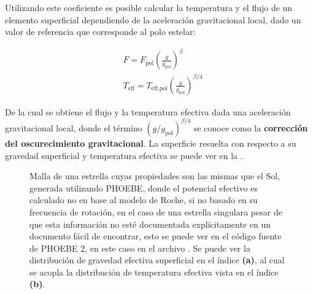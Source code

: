 Utilizando este coeficiente es posible calcular la temperatura y el flujo de un
elemento superficial dependiendo de la aceleración gravitacional local, dado un
valor de referencia que corresponde al polo estelar:

\begin{eqfloat}[!ht]
	\centering
	\begin{equation}
		\begin{split}
			& F = F_{\textrm{pol}} \left(\frac{g}{g_{\textrm{pol}}}\right)^{\beta} \\
			& T_{\textrm{eff}} = T_{\textrm{eff},\textrm{pol}} \left(\frac{g}{g_{\textrm{pol}}}\right)^{\beta/4}
		\end{split}
	\end{equation}	
\end{eqfloat}

De la cual se obtiene el flujo y la temperatura efectiva dada una aceleración
gravitacional local, donde el término
$\left(g/g_{\mathrm{pol}}\right)^{\beta/4}$ se conoce como la \textbf{corrección
del oscurecimiento gravitacional}. La superficie resuelta con respecto a su
gravedad superficial y temperatura efectiva se puede ver en la
.

\begin{figure}[!ht]
	\centering

	\caption[Distribución de gravedad superficial y temperatura efectiva
	local.]{Malla de una estrella cuyas propiedades son las mismas que el Sol,
	generada utilizando PHOEBE, donde el potencial efectivo es calculado no en
	base al modelo de Roche, si no basado en su frecuencia de rotación, en el
	caso de una estrella singular\textemdash a pesar de que esta información no
	esté documentada explícitamente en un documento fácil de encontrar, esto se
	puede ver en el código fuente de PHOEBE 2, en este caso en el archivo
	\href{https://github.com/phoebe-project/phoebe2/blob/master/phoebe/distortions/rotstar.py}{}.
	Se puede ver la distribución de gravedad efectiva superficial en el índice
	\textbf{(a)}, al cual se acopla la distribución de temperatura efectiva
	vista en el índice \textbf{(b)}.}
	\label{figuraMallaPhoebeTeffLogg}
\end{figure}

